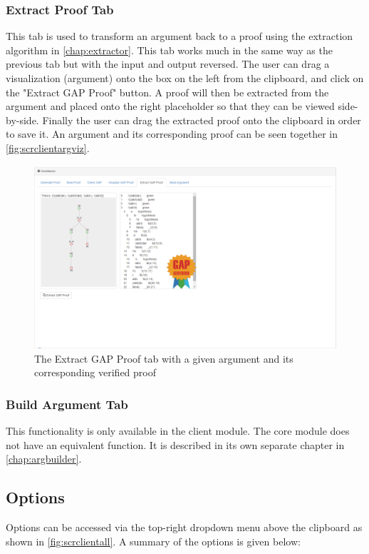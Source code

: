 \documentclass[11pt,twoside,a4paper]{report}
\begin{document}
\subsubsection{Extract Proof Tab}
This tab is used to transform an argument back to a proof using the extraction algorithm in \autoref{chap:extractor}. This tab works much in the same way as the previous tab but with the input and output reversed. The user can drag a visualization (argument) onto the box on the left from the clipboard, and click on the "Extract GAP Proof" button. A proof will then be extracted from the argument and placed onto the right placeholder so that they can be viewed side-by-side. Finally the user can drag the extracted proof onto the clipboard in order to save it. An argument and its corresponding proof can be seen together in \autoref{fig:scrclientargviz}.

\begin{figure}[htp]
\centerline{\includegraphics[scale=0.3]{img/scr-client-argviz.png}}
\caption{The Extract GAP Proof tab with a given argument and its corresponding verified proof\label{fig:scrclientargviz}}
\end{figure}

\subsubsection{Build Argument Tab}
This functionality is only available in the client module. The core module does not have an equivalent function. It is described in its own separate chapter in \autoref{chap:argbuilder}.

\subsection{Options}
\label{subsec:uioptions}
Options can be accessed via the top-right dropdown menu above the clipboard as shown in \autoref{fig:scrclientall}. A summary of the options is given below:
\end{document}
